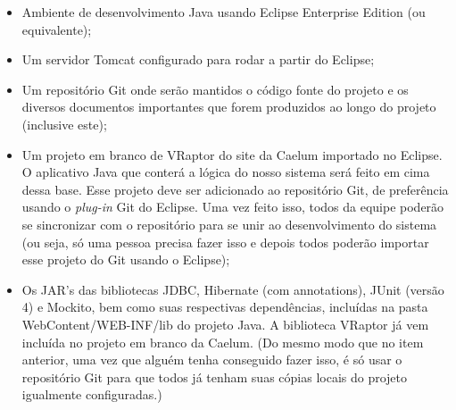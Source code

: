 \documentclass[11pt, a4paper]{article}
\begin{document}
        \begin{itemize}
            \item Ambiente de desenvolvimento Java usando Eclipse Enterprise
            Edition (ou equivalente);
            
            \item Um servidor Tomcat configurado para rodar a partir do Eclipse;
            
            \item Um repositório Git onde serão mantidos o código fonte do
            projeto e os diversos documentos importantes que forem produzidos ao
            longo do projeto (inclusive este);
            
            \item Um projeto em branco de VRaptor do site da Caelum importado no
            Eclipse. O aplicativo Java que conterá a lógica do nosso sistema
            será feito em cima dessa base. Esse projeto deve ser adicionado ao
            repositório Git, de preferência usando o \textit{plug-in} Git do
            Eclipse.
            Uma vez feito isso, todos da equipe poderão se sincronizar com o
            repositório para se unir ao desenvolvimento do sistema (ou seja, só
            uma pessoa precisa fazer isso e depois todos poderão importar esse
            projeto do Git usando o Eclipse);
            
            \item Os JAR's das bibliotecas JDBC, Hibernate (com annotations),
            JUnit (versão 4) e Mockito, bem como suas respectivas dependências,
            incluídas na pasta WebContent/WEB-INF/lib do projeto Java.
            A biblioteca VRaptor já vem incluída no projeto em branco da Caelum.
            (Do mesmo modo que no item anterior, uma vez que alguém tenha
            conseguido fazer isso, é só usar o repositório Git para que todos
            já tenham suas cópias locais do projeto igualmente configuradas.)
        \end{itemize}
\end{document}

